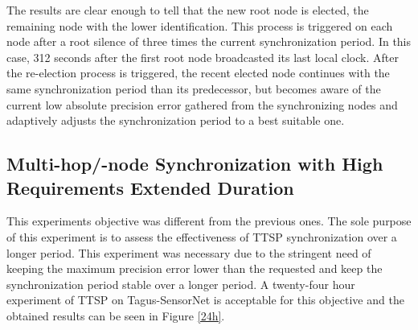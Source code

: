 The results are clear enough to tell that the new root node is elected, the remaining node with the lower identification. This process is triggered on each node after a root silence of three times the current synchronization period. In this case, 312 seconds after the first root node broadcasted its last local clock. After the re-election process is triggered,  the recent elected node continues with the same synchronization period than its predecessor, but becomes aware of the current low absolute precision error gathered from the synchronizing nodes and adaptively adjusts the synchronization period to a best suitable one.

\clearpage

\subsection{Multi-hop/-node Synchronization with High Requirements Extended Duration}
This experiments objective was different from the previous ones. The sole purpose of this experiment is to assess the effectiveness of TTSP synchronization over a longer period. This experiment was necessary due to the stringent need of keeping the maximum precision error lower than the requested and keep the synchronization period stable over a longer period. A twenty-four hour experiment of TTSP on Tagus-SensorNet is acceptable for this objective and the obtained results can be seen in Figure \ref{24h}.

